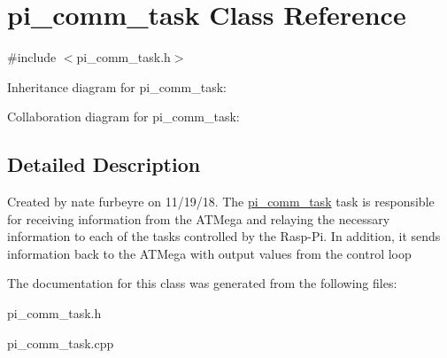 \hypertarget{classpi__comm__task}{}\section{pi\+\_\+comm\+\_\+task Class Reference}
\label{classpi__comm__task}


{\ttfamily \#include $<$pi\+\_\+comm\+\_\+task.\+h$>$}



Inheritance diagram for pi\+\_\+comm\+\_\+task\+:


Collaboration diagram for pi\+\_\+comm\+\_\+task\+:


\subsection{Detailed Description}
Created by nate furbeyre on 11/19/18. The \hyperlink{classpi__comm__task}{pi\+\_\+comm\+\_\+task} task is responsible for receiving information from the A\+T\+Mega and relaying the necessary information to each of the tasks controlled by the Rasp-\/\+Pi. In addition, it sends information back to the A\+T\+Mega with output values from the control loop 

The documentation for this class was generated from the following files\+:\begin{DoxyCompactItemize}
\item 
pi\+\_\+comm\+\_\+task.\+h\item 
pi\+\_\+comm\+\_\+task.\+cpp\end{DoxyCompactItemize}

